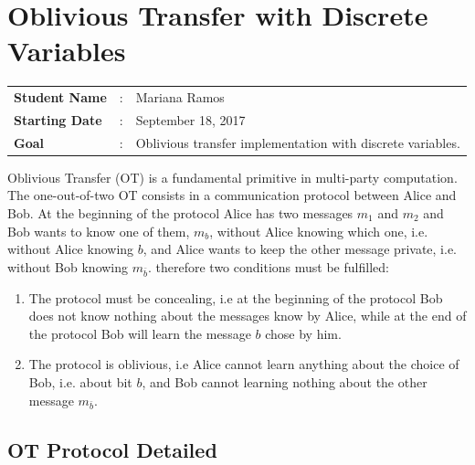 \clearpage
\section{Oblivious Transfer with Discrete Variables}

\begin{tcolorbox}	
\begin{tabular}{p{2.75cm} p{0.2cm} p{10.5cm}} 	
\textbf{Student Name}  &:& Mariana Ramos\\
\textbf{Starting Date} &:& September 18, 2017\\
\textbf{Goal}          &:& Oblivious transfer implementation with discrete variables.
\end{tabular}
\end{tcolorbox}

Oblivious Transfer (OT) is a fundamental primitive in multi-party computation. The one-out-of-two OT consists in a communication protocol between Alice and Bob. At the beginning of the protocol Alice has two messages $m_1$ and $m_2$ and Bob wants to know one of them, $m_b$, without Alice knowing which one, i.e. without Alice knowing $b$, and Alice wants to keep the other message private, i.e. without Bob knowing $m_{\bar{b}}$. therefore two conditions must be fulfilled:
\begin{enumerate}
	\item{The protocol must be concealing, i.e at the beginning of the protocol Bob does not know nothing about the messages know by Alice, while at the end of the protocol Bob will learn the message $b$ chose by him.}
	\item{The protocol is oblivious, i.e Alice cannot learn anything about the choice of Bob, i.e. about bit $b$, and Bob cannot learning nothing about the other message $m_{\bar{b}}$.}
\end {enumerate}

\subsection{OT Protocol Detailed}


